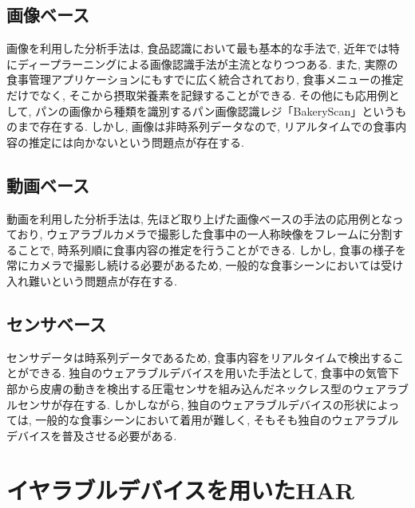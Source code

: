 
\subsection{画像ベース}
画像を利用した分析手法は, 食品認識において最も基本的な手法で, 近年では特にディープラーニングによる画像認識手法が主流となりつつある\cite{10.1145/3063592}. また, 実際の食事管理アプリケーションにもすでに広く統合されており, 食事メニューの推定だけでなく, そこから摂取栄養素を記録することができる. その他にも応用例として, パンの画像から種類を識別するパン画像認識レジ「BakeryScan」というものまで存在する\cite{1523669555317207552}. しかし, 画像は非時系列データなので, リアルタイムでの食事内容の推定には向かないという問題点が存在する.

\subsection{動画ベース}

動画を利用した分析手法は, 先ほど取り上げた画像ベースの手法の応用例となっており, ウェアラブルカメラで撮影した食事中の一人称映像をフレームに分割することで, 時系列順に食事内容の推定を行うことができる\cite{10.1145/3551626.3564964}. しかし, 食事の様子を常にカメラで撮影し続ける必要があるため, 一般的な食事シーンにおいては受け入れ難いという問題点が存在する.


\subsection{センサベース}

センサデータは時系列データであるため, 食事内容をリアルタイムで検出することができる. 独自のウェアラブルデバイスを用いた手法として, 食事中の気管下部から皮膚の動きを検出する圧電センサを組み込んだネックレス型のウェアラブルセンサが存在する\cite{app12126135}. しかしながら, 独自のウェアラブルデバイスの形状によっては, 一般的な食事シーンにおいて着用が難しく, そもそも独自のウェアラブルデバイスを普及させる必要がある.

\section{イヤラブルデバイスを用いたHAR}

